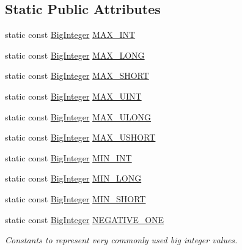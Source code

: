 \subsection*{Static Public Attributes}
\begin{DoxyCompactItemize}
\item 
static const \mbox{\hyperlink{classBigInteger}{Big\+Integer}} \mbox{\hyperlink{classBigInteger_aabf0cd40063eb05e429aaa0da01ab591}{M\+A\+X\+\_\+\+I\+NT}}
\item 
static const \mbox{\hyperlink{classBigInteger}{Big\+Integer}} \mbox{\hyperlink{classBigInteger_a95806eb2e6c271c43e2a9db1f4f3997c}{M\+A\+X\+\_\+\+L\+O\+NG}}
\item 
static const \mbox{\hyperlink{classBigInteger}{Big\+Integer}} \mbox{\hyperlink{classBigInteger_abe2fe880336a857712e05463c2c68545}{M\+A\+X\+\_\+\+S\+H\+O\+RT}}
\item 
static const \mbox{\hyperlink{classBigInteger}{Big\+Integer}} \mbox{\hyperlink{classBigInteger_a2464455af327c0488980c476b686b5c9}{M\+A\+X\+\_\+\+U\+I\+NT}}
\item 
static const \mbox{\hyperlink{classBigInteger}{Big\+Integer}} \mbox{\hyperlink{classBigInteger_a1525fe2273cf30005e8938447a801203}{M\+A\+X\+\_\+\+U\+L\+O\+NG}}
\item 
static const \mbox{\hyperlink{classBigInteger}{Big\+Integer}} \mbox{\hyperlink{classBigInteger_af8946806da52f6cb9107598aa1466a62}{M\+A\+X\+\_\+\+U\+S\+H\+O\+RT}}
\item 
static const \mbox{\hyperlink{classBigInteger}{Big\+Integer}} \mbox{\hyperlink{classBigInteger_a942edd5df7cc33ed3e0531d116c53280}{M\+I\+N\+\_\+\+I\+NT}}
\item 
static const \mbox{\hyperlink{classBigInteger}{Big\+Integer}} \mbox{\hyperlink{classBigInteger_a96aca2cbd95bd16afa004de0cb186845}{M\+I\+N\+\_\+\+L\+O\+NG}}
\item 
static const \mbox{\hyperlink{classBigInteger}{Big\+Integer}} \mbox{\hyperlink{classBigInteger_a1be27840d68d9b74755750de3354609b}{M\+I\+N\+\_\+\+S\+H\+O\+RT}}
\item 
static const \mbox{\hyperlink{classBigInteger}{Big\+Integer}} \mbox{\hyperlink{classBigInteger_a54218bb3532edd5532bf0a3b9442b24b}{N\+E\+G\+A\+T\+I\+V\+E\+\_\+\+O\+NE}}
\begin{DoxyCompactList}\small\item\em Constants to represent very commonly used big integer values. \end{DoxyCompactList}\item 

\end{DoxyCompactItemize}
